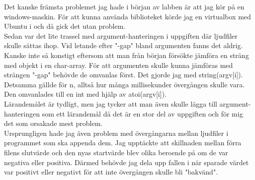 \documentclass[a4paper, 11pt]{article}
\begin{document}
Det kanske främsta problemet jag hade i början av labben är att jag kör på en windows-maskin. För att kunna använda biblioteket körde jag en virtualbox med Ubuntu i och då gick det utan problem. 
\\[\baselineskip]
Sedan var det lite trassel med argument-hanteringen i uppgiften där ljudfiler skulle sättas ihop. Vid letande efter "-gap" bland argumenten fanns det aldrig. Kanske inte så konstigt eftersom att man från början försökte jämföra en sträng med objekt i en char-array. För att argumenten skulle kunna jämföras med strängen "-gap" behövde de omvanlas först. Det gjorde jag med string(argv[i]). Detsamma gällde för n, alltså hur många millisekunder övergången skulle vara. Den omvanlades till en int med hjälp av atoi(argv[i]).
\\[\baselineskip]
Lärandemålet är tydligt, men jag tycker att man även skulle lägga till argument-hanteringen som ett lärandemål då det är en stor del av uppgiften och för mig det som orsakade mest problem. 
\\[\baselineskip]
Ursprungligen hade jag även problem med övergångarna mellan ljudfiler i programmet som ska appenda dem. Jag upptäckte att skillnaden mellan förra filens slutvärde och den nyas startvärde blev olika beroende på om de var negativa eller positiva. Därmed behövde jag dela upp fallen i när sparade värdet var positivt eller negativt för att inte övergången skulle bli "bakvänd".
\end{document}
